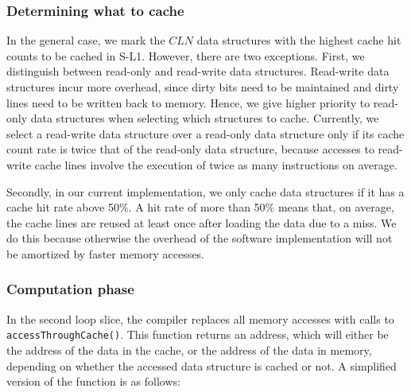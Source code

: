 \subsubsection{\bf Determining what to cache} 
In the general case, we mark the $CLN$ data structures with the highest cache hit counts to be cached
in S-L1.
However, there are two exceptions. 
First, we distinguish between read-only and read-write data structures.
Read-write data structures incur more overhead, since dirty bits need to be maintained and dirty
lines need to be written back to memory.
Hence, we give higher priority to read-only data structures when selecting which structures to
cache.
Currently, we select a read-write data structure over a read-only data structure only
if its cache count rate is twice that of the read-only data structure, because accesses to read-write
cache lines involve the execution of twice as many instructions on average.

Secondly, in our current implementation, we only cache data structures if it has a cache hit rate
above 50\%. A hit rate of more than 50\% means that, on average, the cache lines are reused at least once
after loading the data due to a miss.
We do this because otherwise the overhead of the software implementation will not be amortized by faster memory accesses.

\subsubsection{Computation phase}
In the second loop slice, the compiler replaces all memory accesses with calls to
\texttt{accessThroughCache()}. 
This function returns an address, which will either be the address of the data in the cache, or the
address of the data in memory, depending on whether the accessed data structure is cached or not. 
A simplified version of the function is as follows:

